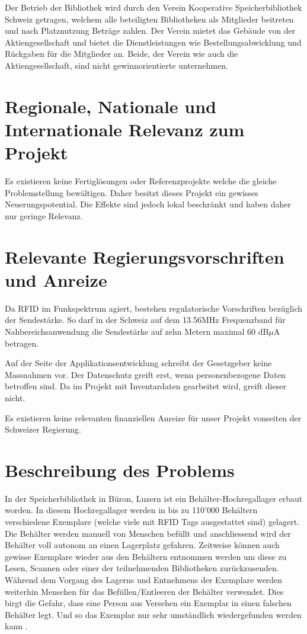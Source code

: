 Der Betrieb der Bibliothek wird durch den Verein Kooperative Speicherbibliothek Schweiz getragen, welchem alle beteiligten Bibliotheken als Mitglieder beitreten und nach Platznutzung Beträge zahlen. Der Verein mietet das Gebäude von der Aktiengesellschaft und bietet die Dienstleistungen wie Bestellungsabwicklung und Rückgaben für die Mitglieder an. Beide, der Verein wie auch die Aktiengesellschaft, sind nicht gewinnorientierte unternehmen.

\section{Regionale, Nationale und Internationale Relevanz zum Projekt}
Es existieren keine Fertiglösungen oder Referenzprojekte welche die gleiche Problemstellung bewältigen. Daher besitzt dieses Projekt ein gewisses Neuerungspotential. Die Effekte sind jedoch lokal beschränkt und haben daher nur geringe Relevanz.

\section{Relevante Regierungsvorschriften und Anreize}
Da RFID im Funkspektrum agiert, bestehen regulatorische Vorschriften bezüglich der Sendestärke. So darf in der Schweiz auf dem 13.56MHz Frequenzband für Nahbereichsanwendung die Sendestärke auf zehn Metern maximal 60 dB$\mu$A betragen.

Auf der Seite der Applikationsentwicklung schreibt der Gesetzgeber keine Massnahmen vor. Der Datenschutz greift erst, wenn personenbezogene Daten betroffen sind. Da im Projekt mit Inventardaten gearbeitet wird, greift dieser nicht.

Es existieren keine relevanten finanziellen Anreize für unser Projekt vonseiten der Schweizer Regierung.

\section{Beschreibung des Problems}
In der Speicherbibliothek in Büron, Luzern ist ein Behälter-Hochregallager erbaut worden. In diesem Hochregallager werden in bis zu 110'000 Behältern verschiedene Exemplare (welche viele mit RFID Tags ausgestattet sind) gelagert. Die Behälter werden manuell von Menschen befüllt und anschliessend wird der Behälter voll autonom an einen Lagerplatz gefahren. Zeitweise können auch gewisse Exemplare wieder aus den Behältern entnommen werden um diese zu Lesen, Scannen oder einer der teilnehmenden Bibliotheken zurückzusenden. Während dem Vorgang des Lagerns und Entnehmens der Exemplare werden weiterhin Menschen für das Befüllen/Entleeren der Behälter verwendet. Dies birgt die Gefahr, dass eine Person aus Versehen ein Exemplar in einen falschen Behälter legt. Und so das Exemplar nur sehr umständlich wiedergefunden werden kann \parencite{HochschuleLuzern2019}.

